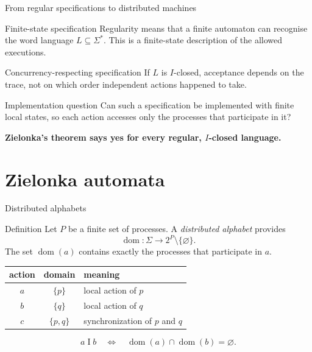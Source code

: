\documentclass[t,11pt]{beamer}
\newcommand{\domn}{\operatorname{dom}}
\newcommand{\ind}{\mathrel{I}}
\begin{document}
\begin{frame}{From regular specifications to distributed machines}
  \begin{block}{Finite-state specification}
    Regularity means that a finite automaton can recognise the word language $L\subseteq\Sigma^*$. This is a finite-state description of the allowed executions.
  \end{block}
  \begin{block}{Concurrency-respecting specification}
    If $L$ is $I$-closed, acceptance depends on the trace, not on which order independent actions happened to take.
  \end{block}
  \begin{block}{Implementation question}
    Can such a specification be implemented with finite local states, so each action accesses only the processes that participate in it?
  \end{block}
  \centering\textbf{Zielonka's theorem says yes for every regular, $I$-closed language.}
\end{frame}

\section{Zielonka automata}

\begin{frame}{Distributed alphabets}
  \begin{block}{Definition}
    Let $P$ be a finite set of processes. A \emph{distributed alphabet} provides
    \[
       \domn:\Sigma\longrightarrow 2^P\setminus\{\varnothing\}.
    \]
    The set $\domn(a)$ contains exactly the processes that participate in $a$.
  \end{block}
  \begin{center}
    \begin{tabular}{c|c|l}
      action & domain & meaning\\ \hline
      $a$ & $\{p\}$ & local action of $p$\\
      $b$ & $\{q\}$ & local action of $q$\\
      $c$ & $\{p,q\}$ & synchronization of $p$ and $q$
    \end{tabular}
  \end{center}
  \[
      a\ind b\quad\Longleftrightarrow\quad \domn(a)\cap\domn(b)=\varnothing.
  \]
\end{frame}
\end{document}
